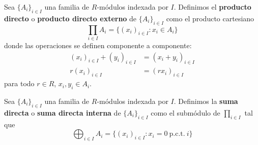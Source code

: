 %
%
%
%
%

\begin{definicion}
	Sea $\{A_i\}_{i \in I}$ una familia de $R$-módulos indexada por $I$. Definimos el \textbf{producto directo} o \textbf{producto directo externo} de $\{A_i\}_{i \in I}$ como el producto cartesiano 
	\[
	\prod_{i \in I} A_i = \{(x_i)_{i \in I} : x_i \in A_i \}
	\]
	donde las operaciones se definen componente a componente:
	\begin{align*}
		(x_i)_{i \in I} + (y_i)_{i \in I} &= (x_i+y_i)_{i \in I} \\
		r(x_i)_{i \in I} &= (rx_i)_{i \in I}
	\end{align*}
	para todo $r \in R$, $x_i,y_i \in A_i$.
\end{definicion}

\begin{definicion}
	Sea $\{A_i\}_{i \in I}$ una familia de $R$-módulos indexada por $I$. Definimos la \textbf{suma directa} o \textbf{suma directa interna} de $\{A_i\}_{i \in I}$ como el submódulo de $\prod_{i \in I}$ tal que 
	\[
		\bigoplus_{i \in I} A_i = \{(x_i)_{i \in I} : x_i = 0 \ \text{p.c.t.} \ i\}
	\]
\end{definicion}

